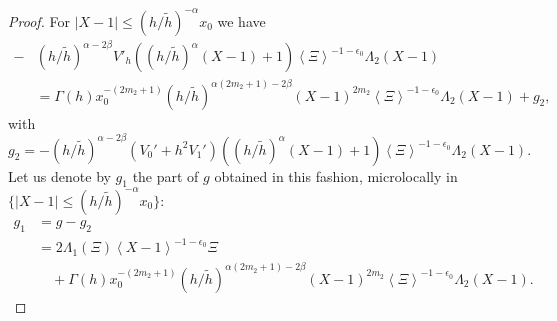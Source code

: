 \documentclass[twoside, final]{amsart}
\theoremstyle{definition}
\numberwithin{equation}{section}
\begin{document}
\begin{proof}
 For $|X-1| {\leqslant} (h/{\tilde{h}})^{-\alpha} x_0$ we have
\begin{align*}
- & (h/{\tilde{h}})^{\alpha - 2 \beta }  V'_h( (h/{\tilde{h}})^{\alpha} (X-1) +1){{\left\langle{{\Xi}}\right\rangle}}^{-1-{{\epsilon}}_0}
\Lambda_2(X-1) \\
& = \Gamma(h) x_0^{-(2m_2+1)}  (h/{\tilde{h}})^{\alpha(2m_2+1) - 2 \beta}
(X-1)^{2m_2} {{\left\langle{{\Xi}}\right\rangle}}^{-1-{{\epsilon}}_0}
\Lambda_2(X-1)  + g_2 ,
\end{align*}
with
\[
g_2 = - (h/{\tilde{h}})^{\alpha - 2 \beta } ( V_0' + h^2 V_1')( (h/{\tilde{h}})^{\alpha} (X-1) +1){{\left\langle{{\Xi}}\right\rangle}}^{-1-{{\epsilon}}_0}
\Lambda_2(X-1) .
\]
Let us denote by $g_1$ the part of $g$ obtained in this fashion,
microlocally in $\{ |X-1| {\leqslant} (h/{\tilde{h}})^{-\alpha} x_0 \}$:
\begin{align*}
g_1 & = g - g_2 \\
& = 2\Lambda_1(\Xi)
{{\left\langle{{X-1}}\right\rangle}}^{-1 - {{\epsilon}}_0}\Xi \\
& \quad + \Gamma(h) x_0^{-(2m_2+1)}  (h/{\tilde{h}})^{\alpha(2m_2+1) - 2 \beta}
(X-1)^{2m_2} {{\left\langle{{\Xi}}\right\rangle}}^{-1-{{\epsilon}}_0}
\Lambda_2(X-1) .
\end{align*}


\end{proof}
\end{document}
